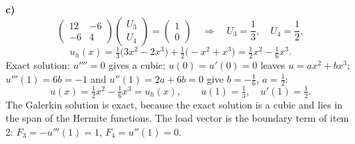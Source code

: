 \textbf{c)}
\[
  \begin{pmatrix} 12 & -6 \\ -6 & 4 \end{pmatrix} \begin{pmatrix} U_3 \\ U_4 \end{pmatrix} = \begin{pmatrix} 1 \\ 0 \end{pmatrix}
  \quad\Longrightarrow\quad U_3 = \frac13, \quad U_4 = \frac12,
\]
\[
  u_h(x) = \tfrac13 \big(3x^2 - 2x^3\big) + \tfrac12 \big(-x^2 + x^3\big) = \tfrac12 x^2 - \tfrac16 x^3 .
\]
Exact solution: $u'''' = 0$ gives a cubic; $u(0) = u'(0) = 0$ leaves $u = a x^2 + b x^3$; $u'''(1) = 6b = -1$ and
$u''(1) = 2a + 6b = 0$ give $b = -\tfrac16$, $a = \tfrac12$:
\[
  u(x) = \tfrac12 x^2 - \tfrac16 x^3 = u_h(x), \qquad u(1) = \tfrac13, \quad u'(1) = \tfrac12 .
\]
The Galerkin solution is exact, because the exact solution is a cubic and lies in the span of the Hermite functions.
The load vector is the boundary term of item 2: $F_3 = -u'''(1) = 1$, $F_4 = u''(1) = 0$.



